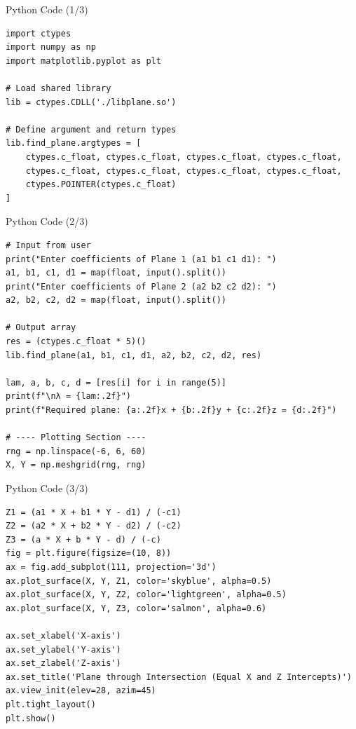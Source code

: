 \documentclass{beamer}
\begin{document}
\begin{frame}[fragile]{Python Code (1/3)}
\lstset{language=Python}
\begin{lstlisting}
import ctypes
import numpy as np
import matplotlib.pyplot as plt

# Load shared library
lib = ctypes.CDLL('./libplane.so')

# Define argument and return types
lib.find_plane.argtypes = [
    ctypes.c_float, ctypes.c_float, ctypes.c_float, ctypes.c_float,
    ctypes.c_float, ctypes.c_float, ctypes.c_float, ctypes.c_float,
    ctypes.POINTER(ctypes.c_float)
]
\end{lstlisting}
\end{frame}
\begin{frame}[fragile]{Python Code (2/3)}
\lstset{language=Python}
\begin{lstlisting}
# Input from user
print("Enter coefficients of Plane 1 (a1 b1 c1 d1): ")
a1, b1, c1, d1 = map(float, input().split())
print("Enter coefficients of Plane 2 (a2 b2 c2 d2): ")
a2, b2, c2, d2 = map(float, input().split())

# Output array
res = (ctypes.c_float * 5)()
lib.find_plane(a1, b1, c1, d1, a2, b2, c2, d2, res)

lam, a, b, c, d = [res[i] for i in range(5)]
print(f"\nλ = {lam:.2f}")
print(f"Required plane: {a:.2f}x + {b:.2f}y + {c:.2f}z = {d:.2f}")

# ---- Plotting Section ----
rng = np.linspace(-6, 6, 60)
X, Y = np.meshgrid(rng, rng)
\end{lstlisting}
\end{frame}
\begin{frame}[fragile]{Python Code (3/3)}
\lstset{language=Python}
\begin{lstlisting}
Z1 = (a1 * X + b1 * Y - d1) / (-c1)
Z2 = (a2 * X + b2 * Y - d2) / (-c2)
Z3 = (a * X + b * Y - d) / (-c)
fig = plt.figure(figsize=(10, 8))
ax = fig.add_subplot(111, projection='3d')
ax.plot_surface(X, Y, Z1, color='skyblue', alpha=0.5)
ax.plot_surface(X, Y, Z2, color='lightgreen', alpha=0.5)
ax.plot_surface(X, Y, Z3, color='salmon', alpha=0.6)

ax.set_xlabel('X-axis')
ax.set_ylabel('Y-axis')
ax.set_zlabel('Z-axis')
ax.set_title('Plane through Intersection (Equal X and Z Intercepts)')
ax.view_init(elev=28, azim=45)
plt.tight_layout()
plt.show()

\end{lstlisting}
\end{frame}
\end{document}
